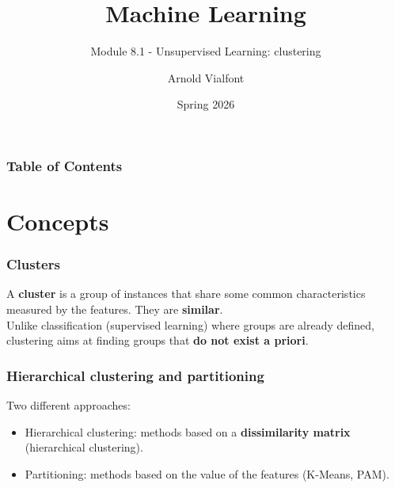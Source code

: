 
\title{Machine Learning}
\subtitle{Module 8.1 - Unsupervised Learning: clustering}
\author[A. Vialfont]{Arnold Vialfont}
\date{Spring 2026}

\begin{frame}
  \titlepage
\end{frame}
\begin{frame}
\frametitle{Table of Contents}
	\tableofcontents
\end{frame}
\section{Concepts}
\begin{frame}
\frametitle{Clusters}
A {\bf cluster} is a group of instances that share some common characteristics measured by the features. They are {\bf similar}. \\
\vspace{0.3cm}
Unlike classification (supervised learning) where groups are already defined, clustering aims at finding groups that {\bf do not exist a priori}.
\end{frame}
\begin{frame}
\frametitle{Hierarchical clustering and partitioning}
Two different approaches:
\begin{itemize}
\item Hierarchical clustering: methods based on a {\bf dissimilarity matrix} (hierarchical clustering).
\item Partitioning: methods based on the value of the features (K-Means, PAM).
\end{itemize}
\end{frame}
